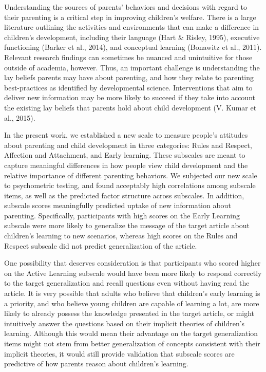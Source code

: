 \documentclass[10pt, letterpaper]{article}
\begin{document}
Understanding the sources of parents' behaviors and decisions with
regard to their parenting is a critical step in improving children's
welfare. There is a large literature outlining the activities and
environments that can make a difference in children's development,
including their language (Hart \& Risley, 1995), executive functioning
(Barker et al., 2014), and conceptual learning (Bonawitz et al., 2011).
Relevant research findings can sometimes be nuanced and unintuitive for
those outside of academia, however. Thus, an important challenge is
understanding the lay beliefs parents may have about parenting, and how
they relate to parenting best-practices as identified by developmental
science. Interventions that aim to deliver new information may be more
likely to succeed if they take into account the existing lay beliefs
that parents hold about child development (V. Kumar et al., 2015).

In the present work, we established a new scale to measure people's
attitudes about parenting and child development in three categories:
Rules and Respect, Affection and Attachment, and Early learning. These
subscales are meant to capture meaningful differences in how people view
child development and the relative importance of different parenting
behaviors. We subjected our new scale to psychometric testing, and found
acceptably high correlations among subscale items, as well as the
predicted factor structure across subscales. In addition, subscale
scores meaningfully predicted uptake of new information about parenting.
Specifically, participants with high scores on the Early Learning
subscale were more likely to generalize the message of the target
article about children's learning to new scenarios, whereas high scores
on the Rules and Respect subscale did not predict generalization of the
article.

One possibility that deserves consideration is that participants who
scored higher on the Active Learning subscale would have been more
likely to respond correctly to the target generalization and recall
questions even without having read the article. It is very possible that
adults who believe that children's early learning is a priority, and who
believe young children are capable of learning a lot, are more likely to
already possess the knowledge presented in the target article, or might
intuitively answer the questions based on their implicit theories of
children's learning. Although this would mean their advantage on the
target generalization items might not stem from better generalization of
concepts consistent with their implicit theories, it would still provide
validation that subscale scores are predictive of how parents reason
about children's learning.
\end{document}
